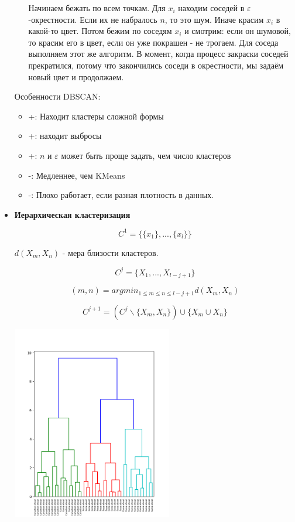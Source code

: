 \documentclass[12pt]{article}
\begin{document}
\begin{itemize}
\begin{itemize}
Начинаем бежать по всем точкам. Для $x_i$ находим соседей в $\varepsilon$-окрестности. Если их не набралось $n$, то это шум. Иначе красим $x_i$ в какой-то цвет. Потом бежим по соседям $x_i$ и смотрим: если он шумовой, то красим его в цвет, если он уже покрашен - не трогаем. Для соседа выполняем этот же алгоритм.
В момент, когда процесс закраски соседей прекратился, потому что закончились соседи в окрестности, мы задаём новый цвет и продолжаем.
\end{itemize}

Особенности DBSCAN:
\begin{itemize}
\item +: Находит кластеры сложной формы
\item +: находит выбросы
\item +: $n$ и $\varepsilon$ может быть проще задать, чем число кластеров
\item -: Медленнее, чем KMeans
\item -: Плохо работает, если разная плотность в данных.
\end{itemize}

\item \textbf{Иерархическая кластеризация}

\[ C^1 = \{ \{ x_1 \}, ..., \{ x_l \} \} \]

$d(X_m, X_n)$ - мера близости кластеров.

\[ C^j = \{ X_1,  ..., X_{l-j+1} \} \]

\[ (m, n) = argmin_{1 \leq m \leq n \leq l-j+1} d(X_m, X_n) \]

\[ C^{j+1} = \left( C^j \backslash \{ X_m, X_n \} \right) \cup \{ X_m \cup X_n \} \]

\includegraphics[width=7cm]{clasterization.png}
\end{itemize}
\end{document}
